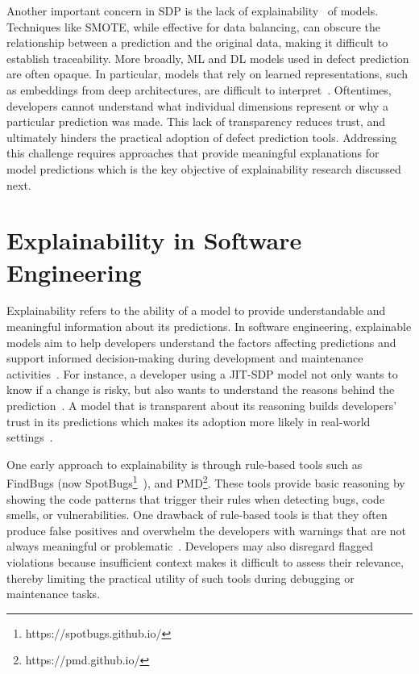 \documentclass[\main/thesis.tex]{subfiles}
\begin{document}
Another important concern in SDP is the lack of explainability~\cite{dam2018explainable, ribeiro2016should} of models. Techniques like SMOTE, while effective for data balancing, can obscure the relationship between a prediction and the original data, making it difficult to establish traceability. More broadly, ML and DL models used in defect prediction are often opaque. In particular, models that rely on learned representations, such as embeddings from deep architectures, are difficult to interpret~\cite{allamanis2014learning}. Oftentimes, developers cannot understand what individual dimensions represent or why a particular prediction was made. This lack of transparency reduces trust, and ultimately hinders the practical adoption of defect prediction tools. Addressing this challenge requires approaches that provide meaningful explanations for model predictions which is the key objective of explainability research discussed next.


\section{Explainability in Software Engineering}
Explainability refers to the ability of a model to provide understandable and meaningful information about its predictions. In software engineering, explainable models aim to help developers understand the factors affecting predictions and support informed decision-making during development and maintenance activities~\cite{dam2018explainable}. For instance, a developer using a JIT-SDP model not only wants to know if a change is risky, but also wants to understand the reasons behind the prediction~\cite{jiarpakdee2020empirical}. A model that is transparent about its reasoning builds developers' trust in its predictions which makes its adoption more likely in real-world settings~\cite{grattan2024need}.

One early approach to explainability is through rule-based tools such as FindBugs (now SpotBugs\footnote{https://spotbugs.github.io/}~\cite{hovemeyer2004finding}), and PMD\footnote{https://pmd.github.io/}. These tools provide basic reasoning by showing the code patterns that trigger their rules when detecting bugs, code smells, or vulnerabilities. One drawback of rule-based tools is that they often produce false positives and overwhelm the developers with warnings that are not always meaningful or problematic~\cite{johnson2013don}. 
Developers may also disregard flagged violations because insufficient context makes it difficult to assess their relevance, thereby limiting the practical utility of such tools during debugging or maintenance tasks. 
\end{document}
